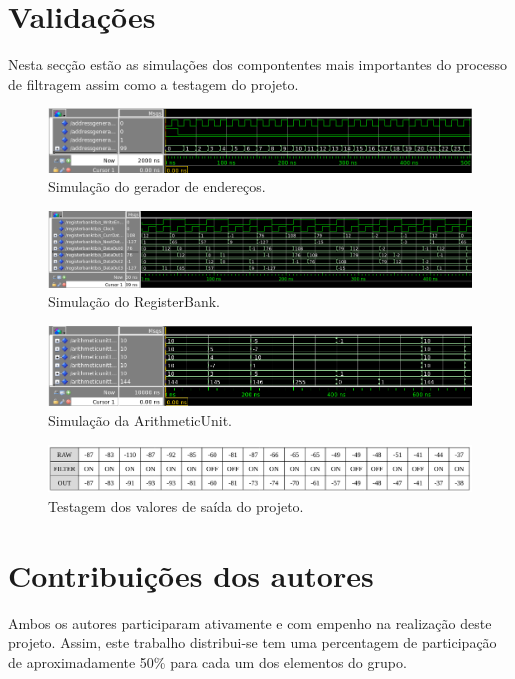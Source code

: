 \documentclass{report}
\begin{document}
\section*{Validações}
\label{chap.validacoes}

Nesta secção estão as simulações dos compontentes mais importantes do processo de filtragem assim como a testagem do projeto.

\begin{figure}[H]
    \centering
    \includegraphics[width=\textwidth]{addressgeneratorval.png}
    \caption{Simulação do gerador de endereços.}
\end{figure}

\begin{figure}[H]
    \centering
    \includegraphics[width=\textwidth]{registerbankval.png}
    \caption{Simulação do RegisterBank.}
\end{figure}

\begin{figure}[H]
    \centering
    \includegraphics[width=\textwidth]{arithmeticunitval.png}
    \caption{Simulação da ArithmeticUnit.}
\end{figure}

\begin{figure}[H]
    \centering
    \includegraphics[width=\textwidth]{values.png}
    \caption{Testagem dos valores de saída do projeto.}
\end{figure}

\section*{Contribuições dos autores}
\label{chap.contribuicoes}

Ambos os autores participaram ativamente e com empenho na realização deste projeto. Assim, este trabalho distribui-se tem uma percentagem de participação de aproximadamente 50\% para cada um dos elementos do grupo.
\end{document}
